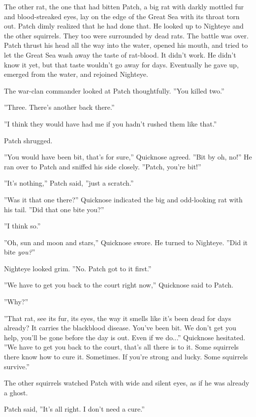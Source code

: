 \documentclass[12pt]{book}
\begin{document}
The other rat, the one that had bitten Patch, a big rat with darkly mottled fur and blood-streaked eyes, lay on the edge of the Great Sea with its throat torn out. Patch dimly realized that he had done that. He looked up to Nighteye and the other squirrels. They too were surrounded by dead rats. The battle was over. Patch thrust his head all the way into the water, opened his mouth, and tried to let the Great Sea wash away the taste of rat-blood. It didn't work. He didn't know it yet, but that taste wouldn't go away for days. Eventually he gave up, emerged from the water, and rejoined Nighteye.

The war-clan commander looked at Patch thoughtfully. ''You killed two.''

''Three. There's another back there.''

''I think they would have had me if you hadn't rushed them like that.''

Patch shrugged.

''You would have been bit, that's for sure,'' Quicknose agreed. ''Bit by %
oh, no!'' He ran over to Patch and sniffed his side closely. ''Patch, you're bit!''

''It's nothing,'' Patch said, ''just a scratch.''

''Was it that one there?'' Quicknose indicated the big and odd-looking rat with his tail. ''Did that one bite you?''

''I think so.''

''Oh, sun and moon and stars,'' Quicknose swore. He turned to Nighteye. ''Did it bite {\it you?}''

Nighteye looked grim. ''No. Patch got to it first.''

''We have to get you back to the court right now,'' Quicknose said to Patch.

''Why?''

''That rat, see its fur, its eyes, the way it smells like it's been dead for days already? It carries the blackblood disease. You've been bit. We don't get you help, you'll be gone before the day is out. Even if we do...'' Quicknose hesitated. ''We have to get you back to the court, that's all there is to it. Some squirrels there know how to cure it. Sometimes. If you're strong and lucky. Some squirrels survive.''

The other squirrels watched Patch with wide and silent eyes, as if he was already a ghost.

Patch said, ''It's all right. I don't need a cure.''
\end{document}
